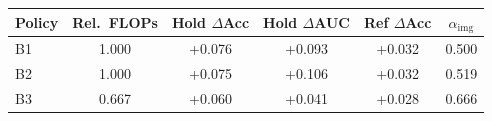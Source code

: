 \begin{tabular}{lccccc}
\toprule
Policy & Rel.\ FLOPs & Hold $\Delta$Acc & Hold $\Delta$AUC & Ref $\Delta$Acc & $\alpha_{\mathrm{img}}$ \\
\midrule
B1 & 1.000 & +0.076 & +0.093 & +0.032 & 0.500 \\
B2 & 1.000 & +0.075 & +0.106 & +0.032 & 0.519 \\
B3 & 0.667 & +0.060 & +0.041 & +0.028 & 0.666 \\
\bottomrule
\end{tabular}